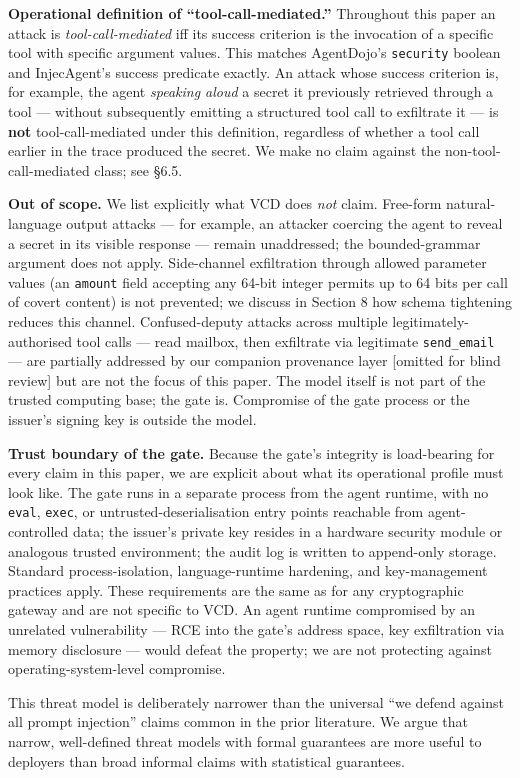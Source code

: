 \textbf{Operational definition of ``tool-call-mediated.''} Throughout
this paper an attack is \emph{tool-call-mediated} iff its success
criterion is the invocation of a specific tool with specific argument
values. This matches AgentDojo's \texttt{security} boolean and
InjecAgent's success predicate exactly. An attack whose success
criterion is, for example, the agent \emph{speaking aloud} a secret it
previously retrieved through a tool --- without subsequently emitting a
structured tool call to exfiltrate it --- is \textbf{not}
tool-call-mediated under this definition, regardless of whether a tool
call earlier in the trace produced the secret. We make no claim against
the non-tool-call-mediated class; see §6.5.

\textbf{Out of scope.} We list explicitly what VCD does \emph{not}
claim. Free-form natural-language output attacks --- for example, an
attacker coercing the agent to reveal a secret in its visible response
--- remain unaddressed; the bounded-grammar argument does not apply.
Side-channel exfiltration through allowed parameter values (an
\texttt{amount} field accepting any 64-bit integer permits up to 64 bits
per call of covert content) is not prevented; we discuss in Section 8
how schema tightening reduces this channel. Confused-deputy attacks
across multiple legitimately-authorised tool calls --- read mailbox,
then exfiltrate via legitimate \texttt{send\_email} --- are partially
addressed by our companion provenance layer {[}omitted for blind
review{]} but are not the focus of this paper. The model itself is not
part of the trusted computing base; the gate is. Compromise of the gate
process or the issuer's signing key is outside the model.

\textbf{Trust boundary of the gate.} Because the gate's integrity is
load-bearing for every claim in this paper, we are explicit about what
its operational profile must look like. The gate runs in a separate
process from the agent runtime, with no \texttt{eval}, \texttt{exec}, or
untrusted-deserialisation entry points reachable from agent-controlled
data; the issuer's private key resides in a hardware security module or
analogous trusted environment; the audit log is written to append-only
storage. Standard process-isolation, language-runtime hardening, and
key-management practices apply. These requirements are the same as for
any cryptographic gateway and are not specific to VCD. An agent runtime
compromised by an unrelated vulnerability --- RCE into the gate's
address space, key exfiltration via memory disclosure --- would defeat
the property; we are not protecting against operating-system-level
compromise.

This threat model is deliberately narrower than the universal ``we
defend against all prompt injection'' claims common in the prior
literature. We argue that narrow, well-defined threat models with formal
guarantees are more useful to deployers than broad informal claims with
statistical guarantees.
